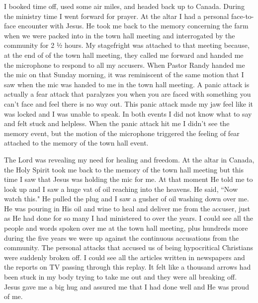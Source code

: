 \documentclass[oneside]{book}
\begin{document}
I booked time off, used some air miles, and headed back up to Canada. During the ministry time I went forward for prayer. At the altar I had a personal face-to-face encounter with Jesus. He took me back to the memory concerning the farm when we were packed into in the town hall meeting and interrogated by the community for 2 ½ hours. My stagefright was attached to that meeting because, at the end of of the town hall meeting, they called me forward and handed me the microphone to respond to all my accusers. When Pastor Randy handed me the mic on that Sunday morning, it was reminiscent of the same motion that I saw when the mic was handed to me in the town hall meeting. A panic attack is actually a fear attack that paralyzes you when you are faced with something you can't face and feel there is no way out. This panic attack made my jaw feel like it was locked and I was unable to speak. In both events I did not know what to say and felt stuck and helpless. When the panic attack hit me I didn't see the memory event, but the motion of the microphone triggered the feeling of fear attached to the memory of the town hall event. 

The Lord was revealing my need for healing and freedom. At the altar in Canada, the Holy Spirit took me back to the memory of the town hall meeting but this time I saw that Jesus was holding the mic for me. At that moment He told me to look up and I saw a huge vat of oil reaching into the heavens. He said, ``Now watch this." He pulled the plug and I saw a gusher of oil washing down over me. He was pouring in His oil and wine to heal and deliver me from the accuser, just as He had done for so many I had ministered to over the years. I could see all the people and words spoken over me at the town hall meeting, plus hundreds more during the five years we were up against the continuous accusations from the community. The personal attacks that accused us of being hypocritical Christians were suddenly broken off. I could see all the articles written in newspapers and the reports on TV passing through this replay. It felt like a thousand arrows had been stuck in my body trying to take me out and they were all breaking off. Jesus gave me a big hug and assured me that I had done well and He was proud of me. 
\end{document}
